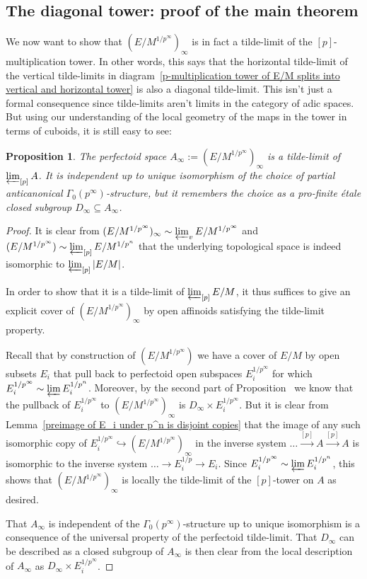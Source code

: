 \documentclass[10pt,oneside]{amsart}
\newtheorem{proposition}[theorem]{Proposition}
\theoremstyle{definition}
\theoremstyle{remark}
\begin{document}
	\subsection{The diagonal tower: proof of the main theorem}
	We now want to show that $(E/M^{1/p^\infty})_\infty$ is in fact a tilde-limit of the $[p]$-multiplication tower. In other words, this says that the horizontal tilde-limit of the vertical tilde-limits in diagram~\ref{p-multiplication tower of E/M splits into vertical and horizontal tower} is also a diagonal tilde-limit.
	This isn't just a formal consequence since tilde-limits aren't limits in the category of adic spaces. But using our understanding of the local geometry of the maps in the tower in terms of cuboids, it is still easy to see:
	
	\begin{proposition}\label{tilde limit of tilde limits of partial towers is tilde limit of whole tower}
		The perfectoid space  $A_\infty:=(E/M^{1/p^\infty})_\infty$ is a tilde-limit of $\varprojlim_{[p]}A$.	It is independent up to unique isomorphism of the choice of partial anticanonical $\Gamma_0(p^\infty)$-structure, but it remembers the choice as a pro-finite \'etale closed subgroup $D_\infty \subseteq A_\infty$. 
	\end{proposition}
	\begin{proof}
	It is clear from $(E/M^{1/p^\infty})_\infty \sim \varprojlim_v E/M^{1/p^\infty}$ and $(E/M^{1/p^\infty})\sim \varprojlim_{[p]} E/M^{1/p^n}$ that the underlying topological space is indeed isomorphic to $\varprojlim_{[p]}|E/M|$.

	In order to show that it is a tilde-limit of $\varprojlim_{[p]}E/M$, it thus suffices to give an explicit cover of $(E/M^{1/p^\infty})_\infty$ by open affinoids satisfying the tilde-limit property. 
	
	Recall that by construction of $(E/M^{1/p^\infty})$ we have a cover of $E/M$ by open subsets $E_i$ that pull back to perfectoid open subspaces $E_i^{1/p^\infty}$ for which $E_i^{1/p^\infty}\sim \varprojlim E_i^{1/p^n}$. Moreover, by the second part of Proposition~\label{horizontal etale map pulls back to vertical limit} we know that the pullback of $E_i^{1/p^\infty}$ to $(E/M^{1/p^\infty})_\infty$ is $D_\infty \times E_i^{1/p^\infty}$.  But it is clear from Lemma~\ref{preimage of E_i under p^n is disjoint copies} that the image of any such isomorphic copy of $E_i^{1/p^\infty}\hookrightarrow   (E/M^{1/p^\infty})_\infty$ in the inverse system $\dots\xrightarrow{[p]}A\xrightarrow{[p]} A$ is isomorphic to the inverse system $\dots\rightarrow E_i^{1/p}\rightarrow E_i$. Since $E_i^{1/p^\infty}\sim \varprojlim E_i^{1/p^n}$, this shows that $(E/M^{1/p^\infty})_\infty$ is locally the tilde-limit of the $[p]$-tower on $A$ as desired.
	
	That $A_\infty$ is independent of the $\Gamma_0(p^\infty)$-structure up to unique isomorphism is a consequence of the universal property of the perfectoid tilde-limit. That $D_\infty$ can be described as a closed subgroup of $A_\infty$ is then clear from the local description of $A_\infty$ as $D_\infty \times E_i^{1/p^\infty}$.
	\end{proof}
	
\end{document}
